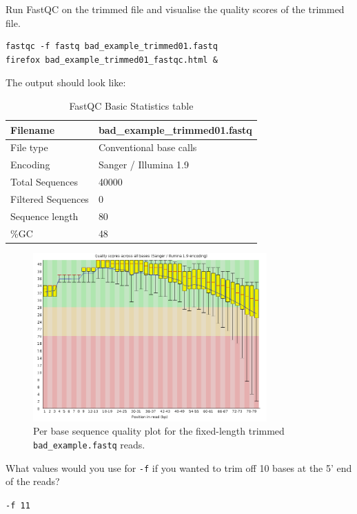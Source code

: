\begin{steps}
Run FastQC on the trimmed file and visualise the quality scores of the trimmed file.
\begin{lstlisting}
fastqc -f fastq bad_example_trimmed01.fastq
firefox bad_example_trimmed01_fastqc.html &
\end{lstlisting}

The output should look like:

\begin{table}[H]
  \centering
  \caption{FastQC Basic Statistics table}
    \begin{tabular}{ll}
    \toprule
    Filename & bad\_example\_trimmed01.fastq\\
    \midrule
     File type & Conventional base calls\\
     Encoding & Sanger / Illumina 1.9\\
     Total Sequences & 40000\\
     Filtered Sequences & 0\\
     Sequence length & 80\\
    \%GC & 48\\
    \bottomrule
    \end{tabular}
  \label{tab:badexampletrimmed}
\end{table}

\begin{figure}[H]
\centering
\includegraphics[width=0.8\textwidth]{ngs-qc/bad_example_trimmed_to_80bp.png}
\caption{Per base sequence quality plot for the fixed-length trimmed \texttt{bad\_example.fastq} reads.}
\label{fig:bad_example_trimmed_plot}
\end{figure}

\end{steps}

\begin{questions}
What values would you use for \texttt{-f} if you wanted to trim off 10 bases at
the 5' end of the reads?
\begin{answer}
\texttt{-f 11}
\end{answer}
\end{questions}

